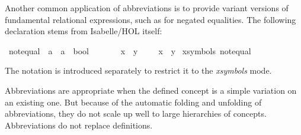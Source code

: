 \begin{isabellebody}
\begin{isamarkuptext}
Another common application of abbreviations is to
provide variant versions of fundamental relational expressions, such
as  for negated equalities.  The following declaration
stems from Isabelle/HOL itself:%
\end{isamarkuptext}%
\isamarkuptrue%
\isamarkupfalse%
\ not{}equal\ {}{}\ {}{}a\ {}\ {}a\ {}\ bool{}\ \ \ \ {}\ {}{}{}{}{}\ {}{}{}\isanewline
{}\ {}x\ {}{}{}\ y\ \ {}\ \ {}\ {}x\ {}\ y{}{}\isanewline
\isanewline
{}\isamarkupfalse%
\ {}xsymbols{}\ not{}equal\ {}\ {}{}{}{}\ {}{}{}%
\begin{isamarkuptext}%
\noindent The notation  is introduced separately to restrict it
to the \emph{xsymbols} mode.

Abbreviations are appropriate when the defined concept is a
simple variation on an existing one.  But because of the automatic
folding and unfolding of abbreviations, they do not scale up well to
large hierarchies of concepts. Abbreviations do not replace
definitions.


\end{isamarkuptext}
\end{isabellebody}
